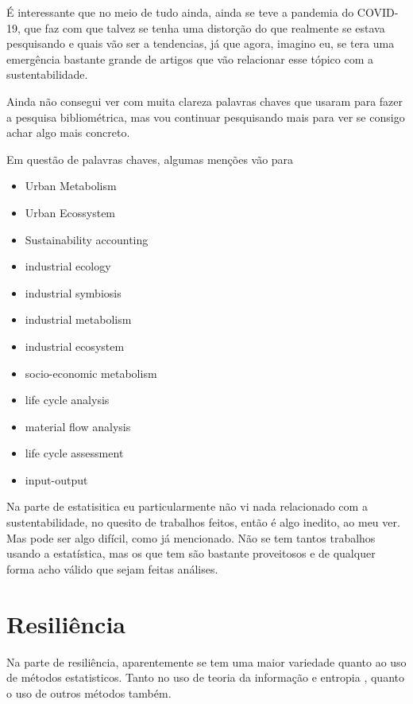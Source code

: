 \documentclass{article}[12pt]
\begin{document}
É interessante que no meio de tudo ainda, ainda se teve a pandemia do COVID-19, que faz com que
talvez se tenha uma distorção do que realmente se estava pesquisando e quais vão ser a tendencias,
já que agora, imagino eu, se tera uma emergência bastante grande de artigos que vão relacionar esse
tópico com a sustentabilidade. \par

Ainda não consegui ver com muita clareza palavras chaves que usaram para fazer a pesquisa
bibliométrica, mas vou continuar pesquisando mais para ver se consigo achar algo mais concreto. \par

Em questão de palavras chaves, algumas menções vão para
\begin{itemize}
    \item Urban Metabolism
    \item Urban Ecossystem
    \item Sustainability accounting
    \item industrial ecology
    \item industrial symbiosis
    \item industrial metabolism
    \item industrial ecosystem
    \item socio-economic metabolism
    \item life cycle analysis
    \item material flow analysis
    \item life cycle assessment
    \item input-output
\end{itemize}

Na parte de estatisitica eu particularmente não vi nada relacionado com a sustentabilidade, no
quesito de trabalhos feitos, então é algo inedito, ao meu ver. Mas pode ser algo difícil, como já
mencionado. Não se tem tantos trabalhos usando a estatística, mas os que tem são bastante
proveitosos e de qualquer forma acho válido que sejam feitas análises. \par

\section{Resiliência}

Na parte de resiliência, aparentemente se tem uma maior variedade quanto ao uso de métodos
estatisticos. Tanto no uso de teoria da informação e entropia \cite{Ulanowicz2009}, quanto o uso de outros métodos
também. %
\end{document}
